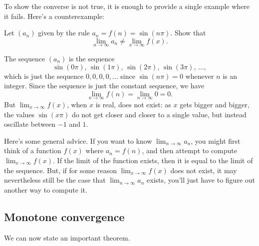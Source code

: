 \documentclass{ximera}
\begin{document}
To show the converse is not true, it is enough to provide a single
example where it fails.  Here's a counterexample:

\begin{example}
  Let $(a_n)$ given by the rule $a_n = f(n)=\sin(n\pi)$. Show that
  \[
  \lim_{n\to\infty} a_n \ne \lim_{x\to \infty}f(x).
  \]
  \begin{explanation}
  The sequence $(a_n)$ is the sequence
  \[
  \sin(0\pi),\, \sin(1\pi),\, \sin(2\pi),\,\sin(3\pi),\,\ldots,
  \]
which is just the sequence $0, 0, 0, 0, \ldots$ since $\sin(n\pi)=0$
whenever $n$ is an integer.  Since the sequence is just the constant
sequence, we have
\[
\lim_{n\to\infty} f(n)= \lim_{n\to\infty} 0 = 0. 
\]
But $\lim_{x\to\infty}f(x)$, when $x$ is real, does not exist: as $x$
gets bigger and bigger, the values $\sin(x\pi)$ do not get closer and
closer to a single value, but instead oscillate between $-1$ and $1$.
  \end{explanation}
\end{example}

Here's some general advice. If you want to know $\lim_{n\to\infty}
a_n$, you might first think of a function $f(x)$ where $a_n = f(n)$,
and then attempt to compute $\lim_{x\to\infty}f(x)$.  If the limit of
the function exists, then it is equal to the limit of the sequence.
But, if for some reason $\lim_{x\to\infty}f(x)$ does not exist, it may
nevertheless still be the case that $\lim_{n\to\infty}a_n$ exists,
you'll just have to figure out another way to compute it.


\subsection{Monotone convergence}

We can now state an important theorem.
\end{document}
